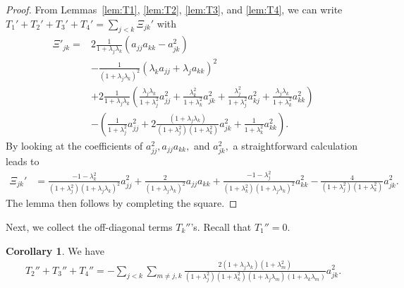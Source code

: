 \documentclass[11pt]{amsart}
\numberwithin{equation}{section}
\theoremstyle{definition}
\theoremstyle{definition}
\newtheorem{cor}[equation]{Corollary}
\newcommand{\pr}[1]{\left(#1\right)}
\begin{document}
\begin{proof}
	From Lemmas~\ref{lem:T1}, \ref{lem:T2}, \ref{lem:T3}, and \ref{lem:T4}, we can write
	$T_1'+T_2'+T_3'+T_4' =\sum\limits_{j<k} \Xi_{jk}'$
	with
	\begin{align*}
	\Xi'_{jk}
	= & 
	2 
	\frac 1{1+\lambda_j\lambda_k} 
	\pr{a_{jj}a_{kk} - a_{jk}^2}\\
	& - 
	\frac 1{(1+\lambda_j\lambda_k)^2} 
	\pr{\lambda_k a_{jj}
		+ \lambda_j a_{kk}
	}^2\\
	& + 2 
	\frac 1{1+\lambda_j\lambda_k}
	\pr{
		\frac{\lambda_j\lambda_k}{1+\lambda_j^2} a_{jj}^2
		+ \frac{\lambda_k^2}{1+\lambda_k^2} a_{jk}^2
		+ \frac{\lambda_j^2}{1+\lambda_j^2} a_{kj}^2
		+ \frac{\lambda_j\lambda_k}{1+\lambda_k^2} a_{kk}^2
	}\\
	& - \pr{
		\frac{1}{1+\lambda_j^2} a_{jj}^2
		+2 \frac{\pr{1+\lambda_j\lambda_k}}{(1+\lambda_j^2)(1+\lambda_k^2)} a_{jk}^2
		+ \frac{1}{1+\lambda_k^2} a_{kk}^2
	}.
	\end{align*}
    By looking at the coefficients of $a_{jj}^2,a_{jj}a_{kk},$ and $a_{jk}^2,$ a straightforward calculation leads to 
	\begin{align*}
	\Xi_{jk}'
	& = \frac{-1-\lambda_k^2}{(1+\lambda_j^2)(1+\lambda_j\lambda_k)^2} a_{jj}^2
	+ \frac 2{(1+\lambda_j\lambda_k)^2} a_{jj}a_{kk}
	+ \frac{-1-\lambda_j^2}{(1+\lambda_k^2)(1+\lambda_j\lambda_k)^2} a_{kk}^2
	-\frac{4}
	{(1+\lambda_j^2)(1+\lambda_k^2)} a_{jk}^2.
	\end{align*}
    The lemma then follows by completing the square.
\end{proof}


Next, we collect the off-diagonal terms $T_k''$'s.
Recall that $T_1''=0.$


\begin{cor}
	\label{lem:off-diag-T}
	We have
	\begin{align*}
	T_2''+T_3''+T_4''
	= -\sum_{j<k}
	\sum_{m\neq j,k}
	\frac{2(1+\lambda_j\lambda_k)(1+\lambda_m^2)}
	{(1+\lambda_j^2)(1+\lambda_k^2)(1+\lambda_j\lambda_m)(1+\lambda_k\lambda_m)}
	a_{jk}^2.
	\end{align*}
\end{cor}
\end{document}
